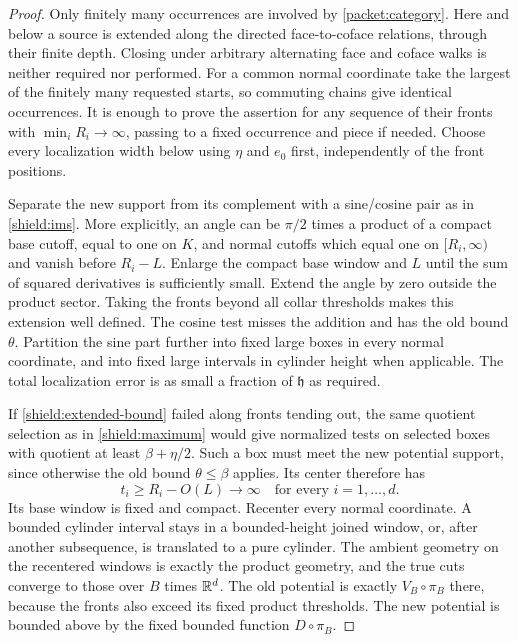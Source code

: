 \begin{proof}
Only finitely many occurrences are involved by \cref{packet:category}.
Here and below a source is extended along the directed face-to-coface
relations, through their finite depth.  Closing under arbitrary
alternating face and coface walks is neither required nor performed.
For a common normal coordinate take the largest of the finitely many
requested starts, so commuting chains give identical occurrences.
It is enough to prove the assertion for any sequence of their fronts
with $\min_iR_i\to\infty$, passing to a fixed occurrence and piece if
needed.  Choose every localization width below using $\eta$ and $e_0$
first, independently of the front positions.

Separate the new support from its complement with a sine/cosine pair
as in \cref{shield:ims}.  More explicitly, an angle can be $\pi/2$
times a product of a compact base cutoff, equal to one on $K$, and
normal cutoffs which equal one on $[R_i,\infty)$ and vanish before
$R_i-L$.  Enlarge the compact base window and $L$ until the sum of
squared derivatives is sufficiently small.  Extend the angle by zero
outside the product sector.  Taking the fronts beyond all collar
thresholds makes this extension well defined.  The cosine test misses
the addition and has the old bound $\theta$.  Partition the sine part
further into fixed large boxes in every normal coordinate, and into
fixed large intervals in cylinder height when applicable.  The total
localization error is as small a fraction of $\mathfrak h$ as required.

If \cref{shield:extended-bound} failed along fronts tending out, the
same quotient selection as in \cref{shield:maximum} would give
normalized tests on selected boxes with quotient at least
$\beta+\eta/2$.  Such a box must meet the new potential support,
since otherwise the old bound $\theta\le\beta$ applies.  Its center
therefore has
\[
 t_i\ge R_i-O(L)\longrightarrow\infty
 \quad\text{for every }i=1,\ldots,d.
\]
Its base window is fixed and compact.  Recenter every normal coordinate.
A bounded cylinder interval stays in a bounded-height joined window,
or, after another subsequence, is translated to a pure cylinder.  The
ambient geometry on the recentered windows is exactly the product
geometry, and the true cuts converge to those over $B$ times $\mathbb R^d$.
The old potential is exactly $V_B\circ\pi_B$ there, because the fronts
also exceed its fixed product thresholds.  The new potential is bounded
above by the fixed bounded function $D\circ\pi_B$.


\end{proof}

